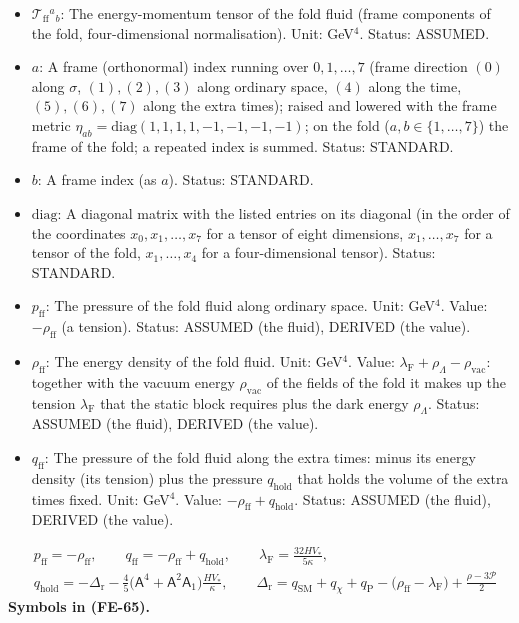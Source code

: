 \documentclass[
  10pt,
]{article}
\providecommand{\tightlist}{%
  \setlength{\itemsep}{0pt}\setlength{\parskip}{0pt}}
\begin{document}
\begin{itemize}
\tightlist
\item
  \(\mathcal{T}_{\mathrm{ff}}{}^a{}_b\): The energy-momentum tensor of
  the fold fluid (frame components of the fold, four-dimensional
  normalisation). Unit: GeV\(^4\). Status: ASSUMED.
\item
  \(a\): A frame (orthonormal) index running over \(0, 1, \dots, 7\)
  (frame direction \((0)\) along \(\sigma\), \((1), (2), (3)\) along
  ordinary space, \((4)\) along the time, \((5), (6), (7)\) along the
  extra times); raised and lowered with the frame metric
  \(\eta_{ab} = \mathrm{diag}(1, 1, 1, 1, -1, -1, -1, -1)\); on the fold
  (\(a, b \in \{1, \dots, 7\}\)) the frame of the fold; a repeated index
  is summed. Status: STANDARD.
\item
  \(b\): A frame index (as \(a\)). Status: STANDARD.
\item
  \(\mathrm{diag}\): A diagonal matrix with the listed entries on its
  diagonal (in the order of the coordinates \(x_0, x_1, \dots, x_7\) for
  a tensor of eight dimensions, \(x_1, \dots, x_7\) for a tensor of the
  fold, \(x_1, \dots, x_4\) for a four-dimensional tensor). Status:
  STANDARD.
\item
  \(p_{\mathrm{ff}}\): The pressure of the fold fluid along ordinary
  space. Unit: GeV\(^4\). Value: \(-\rho_{\mathrm{ff}}\) (a tension).
  Status: ASSUMED (the fluid), DERIVED (the value).
\item
  \(\rho_{\mathrm{ff}}\): The energy density of the fold fluid. Unit:
  GeV\(^4\). Value:
  \(\lambda_{\mathrm{F}} + \rho_\Lambda - \rho_{\mathrm{vac}}\):
  together with the vacuum energy \(\rho_{\mathrm{vac}}\) of the fields
  of the fold it makes up the tension \(\lambda_{\mathrm{F}}\) that the
  static block requires plus the dark energy \(\rho_\Lambda\). Status:
  ASSUMED (the fluid), DERIVED (the value).
\item
  \(q_{\mathrm{ff}}\): The pressure of the fold fluid along the extra
  times: minus its energy density (its tension) plus the pressure
  \(q_{\mathrm{hold}}\) that holds the volume of the extra times fixed.
  Unit: GeV\(^4\). Value: \(-\rho_{\mathrm{ff}} + q_{\mathrm{hold}}\).
  Status: ASSUMED (the fluid), DERIVED (the value).
\end{itemize}

\[
\begin{aligned}
&p_{\mathrm{ff}} = -\rho_{\mathrm{ff}},\qquad q_{\mathrm{ff}} = -\rho_{\mathrm{ff}} + q_{\mathrm{hold}},\qquad
 \lambda_{\mathrm{F}} = \frac{32HV_*}{5\kappa},\\
&q_{\mathrm{hold}} = -\Delta_{\mathrm{r}} - \frac45\big(\mathsf{A}^4 + \mathsf{A}^2\mathsf{A}_1\big)\frac{HV_*}{\kappa},\qquad
 \Delta_{\mathrm{r}} = q_{\mathrm{SM}} + q_\chi + q_{\mathrm{P}} - \big(\rho_{\mathrm{ff}} - \lambda_{\mathrm{F}}\big) + \frac{\rho - 3\mathcal{P}}{2}
\end{aligned} \tag{FE-65}
\] \textbf{Symbols in (FE-65).}
\end{document}
